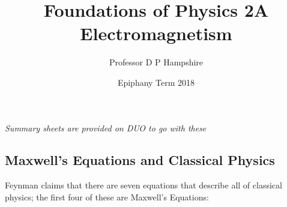\documentclass[a4paper, 11pt, normalem]{report}
\title{Foundations of Physics 2A \\ Electromagnetism \vspace{-20pt}}
\author{Professor D P Hampshire}
\date{\vspace{-15pt}Epiphany Term 2018}
\begin{document}
\maketitle
\tableofcontents

\chapter{}

\textit{Summary sheets are provided on DUO to go with these}

\section{Maxwell's Equations and Classical Physics}
Feynman claims that there are seven equations that describe all of classical physics; the first four of these are Maxwell's Equations:
\end{document}
